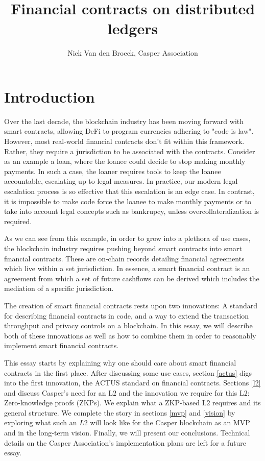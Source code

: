 \documentclass[12pt]{article}
\title{Financial contracts on distributed ledgers}
\author{Nick Van den Broeck, Casper Association}
\begin{document}
\vspace{-1cm}
\maketitle

\tableofcontents
\newpage

\section{Introduction}

Over the last decade, the blockchain industry has been moving forward with smart
contracts, allowing DeFi to program currencies adhering to "code is law".
However, most real-world financial contracts don't fit within this framework.
Rather, they require a jurisdiction to be associated with the contracts.
Consider as an example a loan, where the loanee could decide to stop making
monthly payments. In such a case, the loaner requires tools to keep the loanee
accountable, escalating up to legal measures. In practice, our modern legal
escalation process is so effective that this escalation is an edge case. In
contrast, it is impossible to make code force the loanee to make monthly
payments or to take into account legal concepts such as bankrupcy, unless
overcollateralization is required.

As we can see from this example, in order to grow into a plethora of use cases,
the blockchain industry requires pushing beyond smart contracts into smart
financial contracts. These are on-chain records detailing financial agreements
which live within a set jurisdiction. In essence, a smart financial contract is
an agreement from which a set of future cashflows can be derived which includes
the mediation of a specific jurisdiction.

The creation of smart financial contracts rests upon two innovations: A standard
for describing financial contracts in code, and a way to extend the transaction
throughput and privacy controls on a blockchain. In this essay, we will describe
both of these innovations as well as how to combine them in order to reasonably
implement smart financial contracts.

This essay starts by explaining why one should care about smart financial
contracts in the first place. After discussing some use cases, section
\ref{actus} digs into the first innovation, the ACTUS standard on financial
contracts. Sections \ref{l2} and \label{zkp} discuss Casper's need for an L$2$
and the innovation we require for this L$2$: Zero-knowledge proofs (ZKPs). We
explain what a ZKP-based L$2$ requires and its general structure. We complete
the story in sections \ref{mvp} and \ref{vision} by exploring what such an $L2$
will look like for the Casper blockchain as an MVP and in the long-term vision.
Finally, we will present our conclusions. Technical details on the Casper
Association's implementation plans are left for a future essay.
\end{document}
